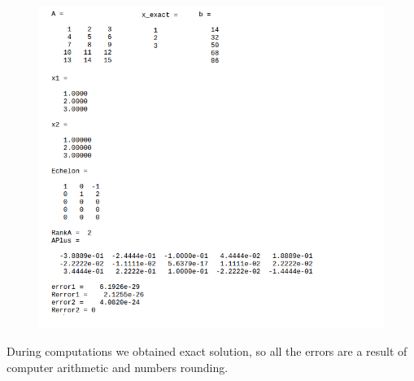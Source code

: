 \documentclass[eng,openany]{mgr}
\begin{document}
\begin{figure}[h]
\centering
\includegraphics[width=0.7\linewidth]{screenshot030}
\label{fig:screenshot030}
\end{figure}

During computations we obtained exact solution, so all the errors are a result of computer arithmetic and numbers rounding.
\newpage
\end{document}
